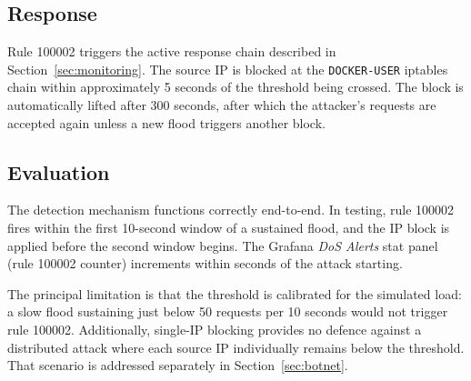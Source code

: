 \subsection{Response}

Rule 100002 triggers the active response chain described in
Section~\ref{sec:monitoring}. The source IP is blocked at the
\texttt{DOCKER-USER} iptables chain within approximately 5 seconds of the
threshold being crossed. The block is automatically lifted after 300 seconds,
after which the attacker's requests are accepted again unless a new flood
triggers another block.

\subsection{Evaluation}

The detection mechanism functions correctly end-to-end. In testing, rule 100002
fires within the first 10-second window of a sustained flood, and the IP block
is applied before the second window begins. The Grafana \emph{DoS Alerts} stat
panel (rule 100002 counter) increments within seconds of the attack starting.

The principal limitation is that the threshold is calibrated for the simulated
load: a slow flood sustaining just below 50 requests per 10 seconds would not
trigger rule 100002. Additionally, single-IP blocking provides no defence
against a distributed attack where each source IP individually remains below
the threshold. That scenario is addressed separately in Section~\ref{sec:botnet}.

